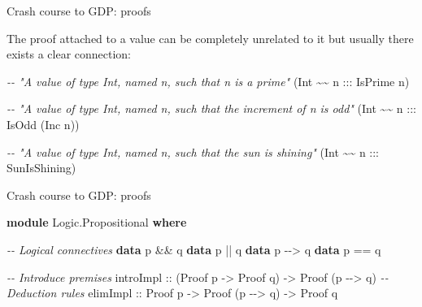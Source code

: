 \documentclass[
  9pt,
  ignorenonframetext,
]{beamer}
\newenvironment{Shaded}{}{}
\newcommand{\CommentTok}[1]{\textcolor[rgb]{0.38,0.63,0.69}{\textit{#1}}}
\newcommand{\DataTypeTok}[1]{\textcolor[rgb]{0.56,0.13,0.00}{#1}}
\newcommand{\KeywordTok}[1]{\textcolor[rgb]{0.00,0.44,0.13}{\textbf{#1}}}
\newcommand{\NormalTok}[1]{#1}
\newcommand{\OperatorTok}[1]{\textcolor[rgb]{0.40,0.40,0.40}{#1}}
\newcommand{\OtherTok}[1]{\textcolor[rgb]{0.00,0.44,0.13}{#1}}
\begin{document}
\begin{frame}[fragile]{Crash course to GDP: proofs}
\protect\hypertarget{crash-course-to-gdp-proofs-2}{}

The proof attached to a value can be completely unrelated to it but
usually there exists a clear connection:

\begin{Shaded}
\begin{Highlighting}[]
\CommentTok{{-}{-} "A value of type Int, named n, such that n is a prime"}
\NormalTok{(}\DataTypeTok{Int} \OperatorTok{\textasciitilde{}\textasciitilde{}}\OtherTok{ n :::} \DataTypeTok{IsPrime}\NormalTok{ n)}

\CommentTok{{-}{-} "A value of type Int, named n, such that the increment of n is odd"}
\NormalTok{(}\DataTypeTok{Int} \OperatorTok{\textasciitilde{}\textasciitilde{}}\OtherTok{ n :::} \DataTypeTok{IsOdd}\NormalTok{ (}\DataTypeTok{Inc}\NormalTok{ n))}

\CommentTok{{-}{-} "A value of type Int, named n, such that the sun is shining"}
\NormalTok{(}\DataTypeTok{Int} \OperatorTok{\textasciitilde{}\textasciitilde{}}\OtherTok{ n :::} \DataTypeTok{SunIsShining}\NormalTok{)}
\end{Highlighting}
\end{Shaded}




\end{frame}

\begin{frame}[fragile]{Crash course to GDP: proofs}
\protect\hypertarget{crash-course-to-gdp-proofs-3}{}
\begin{Shaded}
\begin{Highlighting}[]
\KeywordTok{module} \DataTypeTok{Logic.Propositional} \KeywordTok{where}

\CommentTok{{-}{-} Logical connectives}
\KeywordTok{data}\NormalTok{ p }\OperatorTok{\&\&}\NormalTok{ q }
\KeywordTok{data}\NormalTok{ p }\OperatorTok{||}\NormalTok{ q }
\KeywordTok{data}\NormalTok{ p }\OperatorTok{{-}{-}\textgreater{}}\NormalTok{ q}
\KeywordTok{data}\NormalTok{ p }\OperatorTok{==}\NormalTok{ q}

\CommentTok{{-}{-} Introduce premises}
\NormalTok{introImpl}
\OtherTok{  ::}\NormalTok{ (}\DataTypeTok{Proof}\NormalTok{ p }\OtherTok{{-}\textgreater{}} \DataTypeTok{Proof}\NormalTok{ q)}
  \OtherTok{{-}\textgreater{}} \DataTypeTok{Proof}\NormalTok{ (p }\OperatorTok{{-}{-}\textgreater{}}\NormalTok{ q)}
\CommentTok{{-}{-} Deduction rules}
\NormalTok{elimImpl}
\OtherTok{  ::} \DataTypeTok{Proof}\NormalTok{ p}
  \OtherTok{{-}\textgreater{}} \DataTypeTok{Proof}\NormalTok{ (p }\OperatorTok{{-}{-}\textgreater{}}\NormalTok{ q)}
  \OtherTok{{-}\textgreater{}} \DataTypeTok{Proof}\NormalTok{ q}
\end{Highlighting}
\end{Shaded}





\end{frame}
\end{document}
